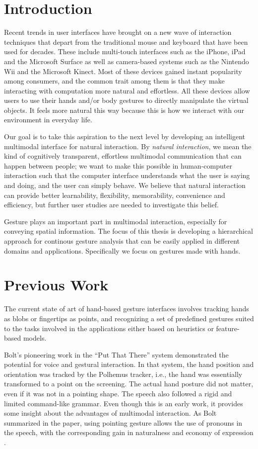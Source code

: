 \section{Introduction}
Recent trends in user interfaces have brought on a new wave of interaction
techniques that depart from the traditional mouse and keyboard that have been
used for decades. These include multi-touch interfaces such as the
iPhone\textsuperscript{\textregistered}, iPad and the Microsoft
Surface\textsuperscript{\textregistered} as well as camera-based systems such as
the Nintendo\textsuperscript{\textregistered} Wii and the Microsoft Kinect. Most
of these devices gained instant popularity among consumers, and the common trait
among them is that they make interacting with computation more natural and
effortless. All these devices allow users to use their hands and/or body
gestures to directly manipulate the virtual objects. It feels more natural this
way because this is how we interact with our environment in everyday
life.
 
Our goal is to take this aspiration to the next level by developing an
intelligent multimodal interface for natural interaction. By \textit{natural
interaction}, we mean the kind of cognitively transparent, effortless multimodal
communication that can happen between people; we want to make this possible in
human-computer interaction such that the computer interface understands what the
user is saying and doing, and the user can simply behave. We believe that
natural interaction can provide better learnability, flexibility, memorability,
convenience and efficiency, but further user studies are needed to investigate
this belief.

Gesture plays an important part in multimodal interaction, especially for
conveying spatial information. The focus of this thesis is developing a
hierarchical approach for continous gesture analysis that can be easily
applied in different domains and applications. Specifically we focus on gestures
made with hands.

\section{Previous Work}
The current state of art of hand-based gesture interfaces involves tracking
hands as blobs or fingertips as points, and recognizing a set of
predefined gestures suited to the tasks involved in the applications
either based on heuristics or feature-based models.

Bolt's pioneering work in the ``Put That There'' system \cite{Bolt80} demonstrated the potential for voice and gestural interaction.  In that system, the hand position and orientation was tracked by the Polhemus tracker, i.e., the hand was essentially transformed to a point on the screening. The actual hand posture did not matter, even if it was not in a pointing shape. The speech also followed a rigid and limited command-like grammar. Even though this is an early work, it provides some insight about the advantages of multimodal interaction. As Bolt summarized in the paper, using pointing gesture allows the use of pronouns in the speech, with the corresponding gain in naturalness and economy of expression \cite{Bolt80}. 

